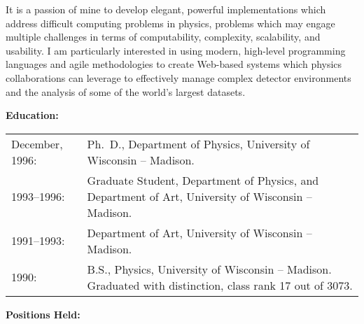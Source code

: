 It is a passion of mine to develop elegant, powerful implementations which address difficult computing problems in physics, problems which may engage multiple challenges in terms of computability, complexity, scalability, and usability.  I am particularly interested in using modern, high-level programming languages and agile methodologies to create Web-based systems which physics collaborations can leverage to effectively manage complex detector environments and the analysis of some of the world's largest datasets.

\vspace{0.5cm}

{\bf Education:}
\vspace{0.25cm}

\begin{tabular}[t]{lp{}}

December, 1996: & Ph.~D., Department of Physics,
University of Wisconsin -- Madison.
\\[0.25cm]

1993--1996: & Graduate Student, Department of Physics, and Department of Art,
University of Wisconsin -- Madison.\\[0.25cm]

1991--1993: & Department of Art, University of Wisconsin -- Madison.
\\[0.25cm]

1990: & B.S., Physics, University of Wisconsin -- Madison.  Graduated
with distinction, class rank 17 out of 3073.

\end{tabular}

\newpage
\pagestyle{myheadings}

{\bf Positions Held:}
\vspace{0.25cm}

